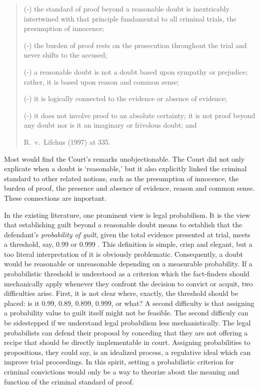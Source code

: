 \documentclass[10pt]{article}
\begin{document}
\begin{quote}
(-) the standard of proof beyond a reasonable 
doubt is inextricably intertwined with that  
principle fundamental to all criminal trials, 
the presumption of innocence;


(-) the burden of proof rests on the prosecution 
throughout the trial and never shifts to the
accused; 

(-) a reasonable doubt is not a doubt based upon 
sympathy or prejudice; 
rather, it is based upon reason and common sense;

(-) it is logically connected to the evidence or  
absence of evidence; 
 
(-) it does not involve proof to an absolute certainty; it is not proof beyond any doubt nor is 
it an imaginary or frivolous doubt;  and

R.\ v.\ Lifchus (1997) at 335.
\end{quote}

\noindent
Most would find the Court's remarks unobjectionable.
The  Court did not only explicate when a doubt is `reasonable,' 
but it also explicitly linked the criminal standard to other related notions, 
such as the presumption of innocence, the burden of proof, the presence and absence of evidence, 
reason and common sense. These connections are important.

In the existing literature, one prominent view is legal probabilism. It is the view that establishing guilt beyond a reasonable doubt means to establish that the defendant's \textit{probability of guilt}, given the total evidence presented at trial, meets a threshold, say, 0.99 or 0.999  \citep{Kaplan1968Decision, Kaye1999Clarifying-the-, Tillers2007}. This definition is simple, crisp and elegant, but a too literal interpretation of it is obviously problematic. Consequently, a doubt would be reasonable or unreasonable depending on a measurable probability.  If a probabilistic threshold is understood as a criterion which the fact-finders should mechanically apply whenever they confront the decision to convict or acquit, two difficulties arise. First, it is not clear where, exactly, the threshold should be placed: is it 0.99, 0.89, 0.899, 0.999, or what? A second difficulty is that assigning a probability value to guilt itself might not be feasible. The second difficuly can be sidestepped if we understand legal probabilism less mechanistically.  The legal probabilists can defend their proposal by conceding that they are not offering a recipe that should be directly implementable in court. Assigning probabilities to propositions, they could say, is an idealized process, a regulative ideal which can improve trial proceedings. In this spirit, setting a probabilistic criterion for criminal convictions would only be a way to theorize about the meaning and function of the criminal standard of proof.
\end{document}
